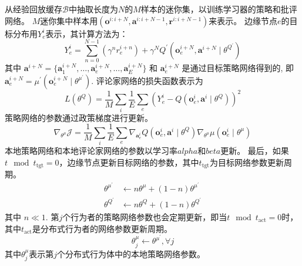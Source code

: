 从经验回放缓存$\mathcal{B}$中抽取长度为$N$的$M$样本的迷你集，以训练学习器的策略和批评网络。
$M$迷你集中样本用$\left(\boldsymbol{o}^{i:i+N}, \boldsymbol{a}^{i:i+N-1}, \boldsymbol{r}^{i:i+N-1}\right)$来表示。
边缘节点$e$的目标分布用$Y_e^i$表示，其计算方法为：
\begin{equation}
	Y_e^{i} = \sum_{n=0}^{N-1} \left( \gamma^{n} r_{e}^{i+n}\right)+\gamma^{N} Q^{\prime}\left(\boldsymbol{o}_{e}^{i+N}, \boldsymbol{a}^{i+N} \mid \theta^{Q^{\prime}} \right)
\end{equation}
\noindent 其中 $\boldsymbol{a}^{i+N} = \{ \boldsymbol{a}_{1}^{i+N}, \ldots, \boldsymbol{a}_{e}^{i+N}, \ldots, \boldsymbol{a}_{E}^{i+N} \}$ 和 $\boldsymbol{a}_{e}^{i+N}$ 是通过目标策略网络得到的, 即$\boldsymbol{a}_{e}^{i+N} = \mu^{\prime}(\boldsymbol{o}_{e}^{i+N} \mid \theta^{\mu^{\prime}})$.
评论家网络的损失函数表示为
\begin{equation}
	{L}\left(\theta^{Q}\right)=\frac{1}{M} \sum_{i} \frac{1}{E} \sum_{e} \left(Y_e^{i}-Q\left(\boldsymbol{o}_{e}^{i}, \boldsymbol{a}^{i} \mid \theta^{Q}\right)\right)^{2}
\end{equation}
策略网络的参数通过政策梯度进行更新。
\begin{equation}
	\nabla_{\theta^{\mu}} \mathcal{J} = \frac{1}{M} \sum_{i} \frac{1}{E} \sum_{e} \nabla_{\boldsymbol{a}_{e}^{i}} Q\left(\boldsymbol{o}_{e}^{i}, \boldsymbol{a}^{i} \mid \theta^{Q}\right) \nabla_{\theta^{\mu}} \mu\left(\boldsymbol{o}_{e}^{i} \mid \theta^{\mu}\right)
\end{equation}
本地策略网络和本地评论家网络的参数以学习率$alpha$和$beta$更新。
最后，如果$t\mod t_{\operatorname{tgt}}=0$，边缘节点更新目标网络的参数，其中$t_{\operatorname{tgt}}$为目标网络参数更新周期。
\begin{align}
	\theta^{\mu^{\prime}} &\leftarrow n \theta^{\mu}+(1-n)  \theta^{\mu^{\prime}}\\
	\theta^{Q^{\prime}} &\leftarrow n  \theta^{Q}+(1-n) \theta^{Q^{\prime}}
\end{align}
\noindent 其中 $n \ll 1$.
第$j$个行为者的策略网络参数也会定期更新，即当$t \mod t_{\operatorname{act}} = 0$时，其中$t_{\operatorname{act}}$是分布式行为者的网络参数更新周期。
\begin{equation}
	\theta_{j}^{\mu} \leftarrow \theta^{\mu^{\prime}}, \forall j
\end{equation}
其中$\theta_{j}^{\mu}$表示第$j$个分布式行为体中的本地策略网络参数。
	
